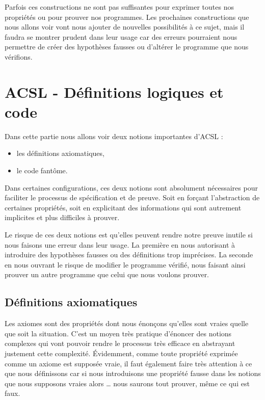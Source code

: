 \documentclass[12pt,francais,]{scrbook}
\providecommand{\tightlist}{%
  \setlength{\itemsep}{0pt}\setlength{\parskip}{0pt}}
\begin{document}
Parfois ces constructions ne sont pas suffisantes pour exprimer toutes
nos propriétés ou pour prouver nos programmes. Les prochaines
constructions que nous allons voir vont nous ajouter de nouvelles
possibilités à ce sujet, mais il faudra se montrer prudent dans leur
usage car des erreurs pourraient nous permettre de créer des hypothèses
fausses ou d'altérer le programme que nous vérifions.

\chapter{ACSL - Définitions logiques et
code}\label{acsl---duxe9finitions-logiques-et-code}

Dans cette partie nous allons voir deux notions importantes d'ACSL :

\begin{itemize}
\tightlist
\item
  les définitions axiomatiques,
\item
  le code fantôme.
\end{itemize}

Dans certaines configurations, ces deux notions sont absolument
nécessaires pour faciliter le processus de spécification et de preuve.
Soit en forçant l'abstraction de certaines propriétés, soit en
explicitant des informations qui sont autrement implicites et plus
difficiles à prouver.

Le risque de ces deux notions est qu'elles peuvent rendre notre preuve
inutile si nous faisons une erreur dans leur usage. La première en nous
autorisant à introduire des hypothèses fausses ou des définitions trop
imprécises. La seconde en nous ouvrant le risque de modifier le
programme vérifié, nous faisant ainsi prouver un autre programme que
celui que nous voulons prouver.

\section{Définitions axiomatiques}\label{duxe9finitions-axiomatiques}

Les axiomes sont des propriétés dont nous énonçons qu'elles sont vraies
quelle que soit la situation. C'est un moyen très pratique d'énoncer des
notions complexes qui vont pouvoir rendre le processus très efficace en
abstrayant justement cette complexité. Évidemment, comme toute propriété
exprimée comme un axiome est supposée vraie, il faut également faire
très attention à ce que nous définissons car si nous introduisons une
propriété fausse dans les notions que nous supposons vraies alors
\ldots{} nous saurons tout prouver, même ce qui est faux.
\end{document}
